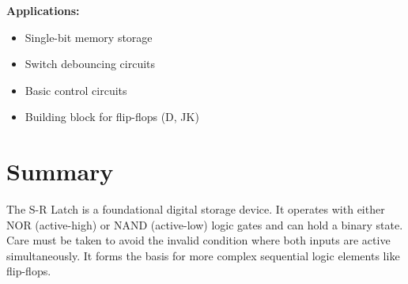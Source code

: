 \documentclass[12pt]{article}
\begin{document}
\vspace{1.5em}
\textbf{Applications:}
\begin{itemize}
    \item Single-bit memory storage
    \item Switch debouncing circuits
    \item Basic control circuits
    \item Building block for flip-flops (D, JK)
\end{itemize}

\section*{Summary}

The S-R Latch is a foundational digital storage device. It operates with either NOR (active-high) or NAND (active-low) logic gates and can hold a binary state. Care must be taken to avoid the invalid condition where both inputs are active simultaneously. It forms the basis for more complex sequential logic elements like flip-flops.
\end{document}
